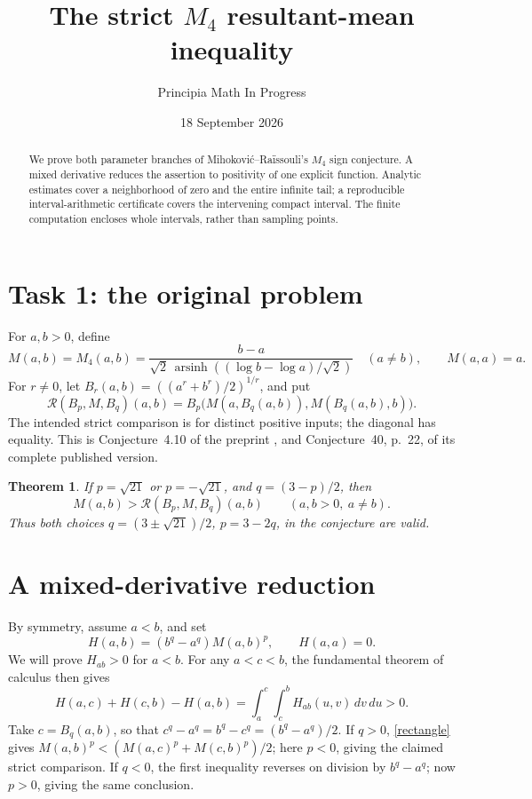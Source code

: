 \documentclass[11pt]{article}
\title{The strict \(M_4\) resultant-mean inequality}
\author{Principia Math In Progress}
\date{18 September 2026}
\newtheorem{theorem}{Theorem}
\newcommand{\asinh}{\operatorname{arsinh}}
\newcommand{\R}{\mathcal R}
\begin{document}
\maketitle
\begin{abstract}
We prove both parameter branches of Mihokovi\'c--Ra\"issouli's
\(M_4\) sign conjecture. A mixed derivative reduces the assertion to
positivity of one explicit function. Analytic estimates cover a
neighborhood of zero and the entire infinite tail; a reproducible
interval-arithmetic certificate covers the intervening compact interval.
The finite computation encloses whole intervals, rather than sampling
points.
\end{abstract}

\section*{Task 1: the original problem}
For \(a,b>0\), define
\[
 M(a,b)=M_4(a,b)=
 \frac{b-a}{\sqrt2\,\asinh((\log b-\log a)/\sqrt2)}
 \quad(a\ne b),\qquad M(a,a)=a.
\]
For \(r\ne0\), let \(B_r(a,b)=((a^r+b^r)/2)^{1/r}\), and put
\[
 \R(B_p,M,B_q)(a,b)
 =B_p\bigl(M(a,B_q(a,b)),M(B_q(a,b),b)\bigr).
\]
The intended strict comparison is for distinct positive inputs; the
diagonal has equality. This is Conjecture~4.10 of the preprint
\cite{MR}, and Conjecture~40, p.~22, of its complete published version.

\begin{theorem}\label{main}
If \(p=\sqrt{21}\) or \(p=-\sqrt{21}\), and \(q=(3-p)/2\), then
\[
 M(a,b)>\R(B_p,M,B_q)(a,b)\qquad(a,b>0,\ a\ne b).
\]
Thus both choices \(q=(3\pm\sqrt{21})/2\), \(p=3-2q\), in the
conjecture are valid.
\end{theorem}

\section*{A mixed-derivative reduction}
By symmetry, assume \(a<b\), and set
\[
 H(a,b)=(b^q-a^q)M(a,b)^p,\qquad H(a,a)=0.
\]
We will prove \(H_{ab}>0\) for \(a<b\).
For any \(a<c<b\), the fundamental theorem of calculus then gives
\begin{equation}\label{rectangle}
 H(a,c)+H(c,b)-H(a,b)
   =\int_a^c\int_c^b H_{ab}(u,v)\,dv\,du>0.
\end{equation}
Take \(c=B_q(a,b)\), so that
\(c^q-a^q=b^q-c^q=(b^q-a^q)/2\).
If \(q>0\), \eqref{rectangle} gives
\(M(a,b)^p<(M(a,c)^p+M(c,b)^p)/2\); here \(p<0\), giving the
claimed strict comparison. If \(q<0\), the first inequality reverses
on division by \(b^q-a^q\); now \(p>0\), giving the same conclusion.
\end{document}
